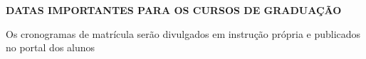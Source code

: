 \documentclass[thesis]{hmcposter}
\begin{document}
\begin{poster}
\begin{center}
\large \textbf{DATAS IMPORTANTES PARA OS CURSOS DE GRADUAÇÃO}
\newline
\null
\newline
\begin{table}
\centering
{}
\end{table}
\newline
\null
\newline
Os cronogramas de matrícula serão divulgados em instrução própria e publicados no portal dos alunos
\end{center}
\vfill
\null

\end{poster}
\end{document}

